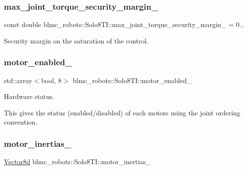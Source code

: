 \subsubsection{\texorpdfstring{max\+\_\+joint\+\_\+torque\+\_\+security\+\_\+margin\+\_\+}{max\_joint\_torque\_security\_margin\_}}
{\footnotesize\ttfamily const double blmc\+\_\+robots\+::\+Solo8\+T\+I\+::max\+\_\+joint\+\_\+torque\+\_\+security\+\_\+margin\+\_\+ = 0.\hspace{0.3cm}{\ttfamily [static]}, {\ttfamily [private]}}



Security margin on the saturation of the control. 

\mbox{\label{classblmc__robots_1_1Solo8TI_a3dbd4bd26b5a4273e94ced22d43a9890}} 
\subsubsection{\texorpdfstring{motor\+\_\+enabled\+\_\+}{motor\_enabled\_}}
{\footnotesize\ttfamily std\+::array$<$bool, 8$>$ blmc\+\_\+robots\+::\+Solo8\+T\+I\+::motor\+\_\+enabled\+\_\+\hspace{0.3cm}{\ttfamily [private]}}



Hardware status. 

This gives the status (enabled/disabled) of each motors using the joint ordering convention. \mbox{\label{classblmc__robots_1_1Solo8TI_a59f11040a17d232823756c26c6b68145}} 
\subsubsection{\texorpdfstring{motor\+\_\+inertias\+\_\+}{motor\_inertias\_}}
{\footnotesize\ttfamily \hyperlink{common__header_8hpp_a98975ffbe0bca1296078e0350dfedd60}{Vector8d} blmc\+\_\+robots\+::\+Solo8\+T\+I\+::motor\+\_\+inertias\+\_\+\hspace{0.3cm}{\ttfamily [private]}}



